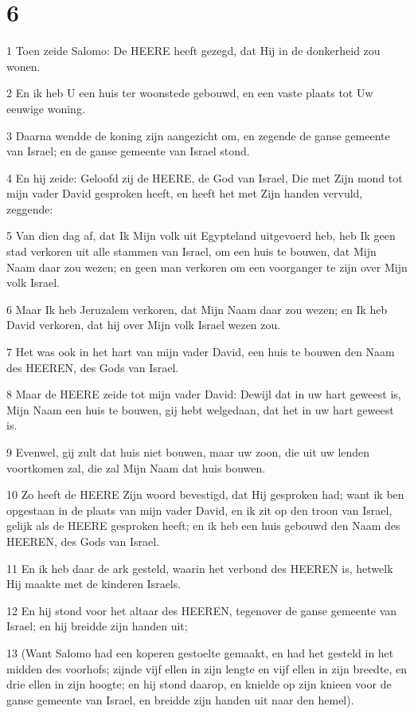 \chapter{6}

\par 1 Toen zeide Salomo: De HEERE heeft gezegd, dat Hij in de donkerheid zou wonen.
\par 2 En ik heb U een huis ter woonstede gebouwd, en een vaste plaats tot Uw eeuwige woning.
\par 3 Daarna wendde de koning zijn aangezicht om, en zegende de ganse gemeente van Israel; en de ganse gemeente van Israel stond.
\par 4 En hij zeide: Geloofd zij de HEERE, de God van Israel, Die met Zijn mond tot mijn vader David gesproken heeft, en heeft het met Zijn handen vervuld, zeggende:
\par 5 Van dien dag af, dat Ik Mijn volk uit Egypteland uitgevoerd heb, heb Ik geen stad verkoren uit alle stammen van Israel, om een huis te bouwen, dat Mijn Naam daar zou wezen; en geen man verkoren om een voorganger te zijn over Mijn volk Israel.
\par 6 Maar Ik heb Jeruzalem verkoren, dat Mijn Naam daar zou wezen; en Ik heb David verkoren, dat hij over Mijn volk Israel wezen zou.
\par 7 Het was ook in het hart van mijn vader David, een huis te bouwen den Naam des HEEREN, des Gods van Israel.
\par 8 Maar de HEERE zeide tot mijn vader David: Dewijl dat in uw hart geweest is, Mijn Naam een huis te bouwen, gij hebt welgedaan, dat het in uw hart geweest is.
\par 9 Evenwel, gij zult dat huis niet bouwen, maar uw zoon, die uit uw lenden voortkomen zal, die zal Mijn Naam dat huis bouwen.
\par 10 Zo heeft de HEERE Zijn woord bevestigd, dat Hij gesproken had; want ik ben opgestaan in de plaats van mijn vader David, en ik zit op den troon van Israel, gelijk als de HEERE gesproken heeft; en ik heb een huis gebouwd den Naam des HEEREN, des Gods van Israel.
\par 11 En ik heb daar de ark gesteld, waarin het verbond des HEEREN is, hetwelk Hij maakte met de kinderen Israels.
\par 12 En hij stond voor het altaar des HEEREN, tegenover de ganse gemeente van Israel; en hij breidde zijn handen uit;
\par 13 (Want Salomo had een koperen gestoelte gemaakt, en had het gesteld in het midden des voorhofs; zijnde vijf ellen in zijn lengte en vijf ellen in zijn breedte, en drie ellen in zijn hoogte; en hij stond daarop, en knielde op zijn knieen voor de ganse gemeente van Israel, en breidde zijn handen uit naar den hemel).
